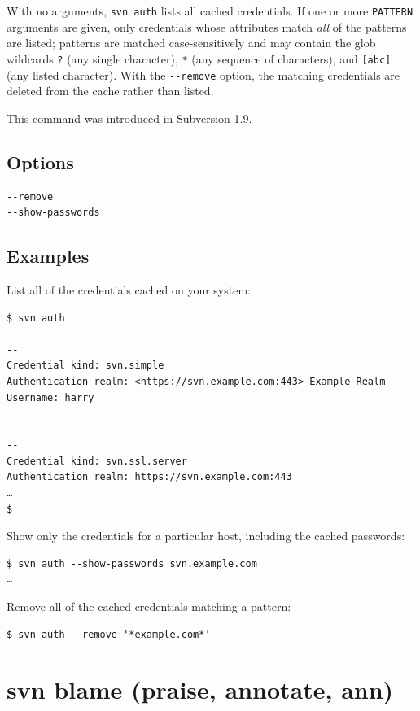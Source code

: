 With no arguments, \texttt{svn\ auth} lists all cached credentials. If
one or more \texttt{PATTERN} arguments are given, only credentials whose
attributes match \emph{all} of the patterns are listed; patterns are
matched case-sensitively and may contain the glob wildcards \texttt{?}
(any single character), \texttt{*} (any sequence of characters), and
\texttt{{[}abc{]}} (any listed character). With the \texttt{-\/-remove}
option, the matching credentials are deleted from the cache rather than
listed.

This command was introduced in Subversion 1.9.

\subsection{Options}

\begin{verbatim}
--remove
--show-passwords
\end{verbatim}

\subsection{Examples}

List all of the credentials cached on your system:

\begin{verbatim}
$ svn auth
------------------------------------------------------------------------
Credential kind: svn.simple
Authentication realm: <https://svn.example.com:443> Example Realm
Username: harry

------------------------------------------------------------------------
Credential kind: svn.ssl.server
Authentication realm: https://svn.example.com:443
…
$
\end{verbatim}

Show only the credentials for a particular host, including the cached
passwords:

\begin{verbatim}
$ svn auth --show-passwords svn.example.com
…
\end{verbatim}

Remove all of the cached credentials matching a pattern:

\begin{verbatim}
$ svn auth --remove '*example.com*'
\end{verbatim}

\section{svn blame (praise, annotate, ann)}\label{svn.ref.svn.c.blame}


